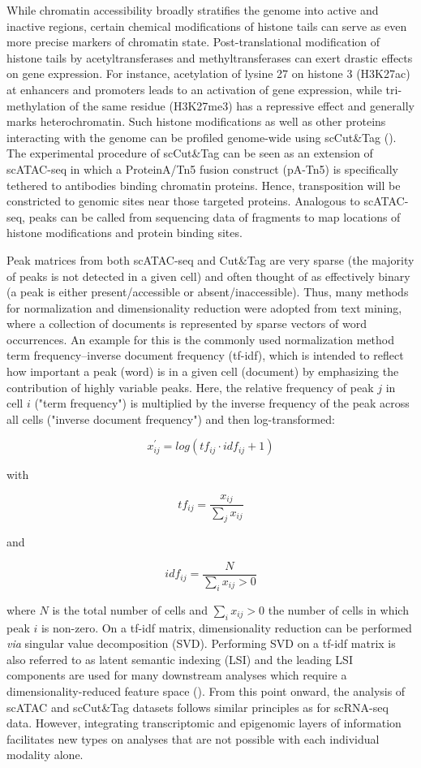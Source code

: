 While chromatin accessibility broadly stratifies the genome into active and inactive regions, certain chemical modifications of histone tails can serve as even more precise markers of chromatin state. Post-translational modification of histone tails by acetyltransferases and methyltransferases can exert drastic effects on gene expression. For instance, acetylation of lysine 27 on histone 3 (H3K27ac) at enhancers and promoters leads to an activation of gene expression, while tri-methylation of the same residue (H3K27me3) has a repressive effect and generally marks heterochromatin. Such histone modifications as well as other proteins interacting with the genome can be profiled genome-wide using scCut\&Tag (\cite{bartosovic_single-cell_2021,kaya-okur_cuttag_2019}). The experimental procedure of scCut\&Tag can be seen as an extension of scATAC-seq in which a ProteinA/Tn5 fusion construct (pA-Tn5) is specifically tethered to antibodies binding chromatin proteins. Hence, transposition will be constricted to genomic sites near those targeted proteins. Analogous to scATAC-seq, peaks can be called from sequencing data of fragments to map locations of histone modifications and protein binding sites.

Peak matrices from both scATAC-seq and Cut\&Tag are very sparse (the majority of peaks is not detected in a given cell) and often thought of as effectively binary (a peak is either present/accessible or absent/inaccessible). Thus, many methods for normalization and dimensionality reduction were adopted from text mining, where a collection of documents is represented by sparse vectors of word occurrences. An example for this is the commonly used normalization method term frequency–inverse document frequency (tf-idf), which is intended to reflect how important a peak (word) is in a given cell (document) by emphasizing the contribution of highly variable peaks. Here, the relative frequency of peak $j$ in cell $i$ ("term frequency") is multiplied by the inverse frequency of the peak across all cells ("inverse document frequency") and then log-transformed:

\[ x^{\prime}_{ij} = log(tf_{ij} \cdot idf_{ij} + 1) \]

with

\[ tf_{ij} = \frac{x_{ij}} {\sum_{j}{x_{ij}}} \]

and 

\[ idf_{ij} = \frac{N}{\sum_{i}{x_{ij} > 0}} \]

where $N$ is the total number of cells and $\sum_{i}{x_{ij} > 0}$ the number of cells in which peak $i$ is non-zero. On a tf-idf matrix, dimensionality reduction can be performed \textit{via} singular value decomposition (SVD). Performing SVD on a tf-idf matrix is also referred to as latent semantic indexing (LSI) and the leading LSI components are used for many downstream analyses which require a dimensionality-reduced feature space (\cite{stuart_comprehensive_2019}). From this point onward, the analysis of scATAC and scCut\&Tag datasets follows similar principles as for scRNA-seq data. However, integrating transcriptomic and epigenomic layers of information facilitates new types on analyses that are not possible with each individual modality alone.



